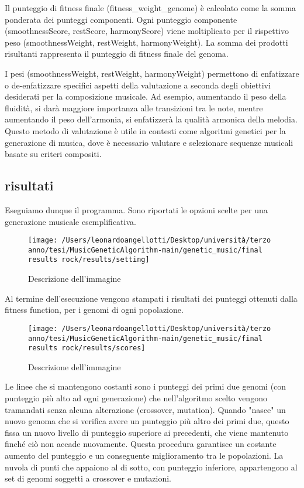 \documentclass[a4paper,12pt]{report}
\begin{document}
Il punteggio di fitness finale (fitness_weight_genome) è calcolato come la somma ponderata dei punteggi componenti.
Ogni punteggio componente (smoothnessScore, restScore, harmonyScore) viene moltiplicato per il rispettivo peso (smoothnessWeight, restWeight, harmonyWeight).
La somma dei prodotti risultanti rappresenta il punteggio di fitness finale del genoma.

I pesi (smoothnessWeight, restWeight, harmonyWeight) permettono di enfatizzare o de-enfatizzare specifici aspetti della valutazione a seconda degli obiettivi desiderati per la composizione musicale. 
Ad esempio, aumentando il peso della fluidità, si darà maggiore importanza alle transizioni tra le note, mentre aumentando il peso dell'armonia, si enfatizzerà la qualità armonica della melodia. 
Questo metodo di valutazione è utile in contesti come algoritmi genetici per la generazione di musica, dove è necessario valutare e selezionare sequenze musicali basate su criteri compositi.

\subsection{risultati}

Eseguiamo dunque il programma.
Sono riportati le opzioni scelte per una generazione musicale esemplificativa.

\begin{figure}[h!]
    \centering
    \texttt{[image: /Users/leonardoangellotti/Desktop/università/terzo anno/tesi/MusicGeneticAlgorithm-main/genetic\_music/final results rock/results/setting]} 
    \caption{Descrizione dell'immagine}
    \label{fig:immagine}
\end{figure}

Al termine dell'esecuzione vengono stampati i risultati dei punteggi ottenuti dalla fitness function, per i genomi di ogni popolazione.

\begin{figure}[h!]
    \centering
    \texttt{[image: /Users/leonardoangellotti/Desktop/università/terzo anno/tesi/MusicGeneticAlgorithm-main/genetic\_music/final results rock/results/scores]} 
    \caption{Descrizione dell'immagine}
    \label{fig:immagine}
\end{figure}

Le linee che si mantengono costanti sono i punteggi dei primi due genomi (con punteggio più alto ad ogni generazione) che nell'algoritmo scelto vengono tramandati senza alcuna alterazione (crossover, mutation).
Quando "nasce" un nuovo genoma che si verifica avere un punteggio più altro dei primi due, questo fissa un nuovo livello di punteggio superiore ai precedenti, che viene mantenuto finché ciò non accade nuovamente.
Questa procedura garantisce un costante aumento del punteggio e un conseguente miglioramento tra le popolazioni.
La nuvola di punti che appaiono al di sotto, con punteggio inferiore, appartengono al set di genomi soggetti a crossover e mutazioni.
\end{document}
